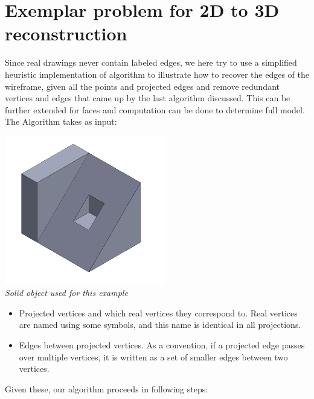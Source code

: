 \documentclass[
11pt, %
english, %
singlespacing, %
headsepline, %
]{MastersDoctoralThesis} %
\begin{document}
\section{Exemplar problem for 2D to 3D reconstruction}
Since real drawings never contain labeled edges, we here try to use a simplified heuristic implementation of algorithm to illustrate how to recover the edges of the wireframe, given all the points and projected edges and remove redundant vertices and edges that came up by the last algorithm discussed. This can be further extended for faces and computation can be done to determine full model. The Algorithm takes as input:\\
\begin{center}
\includegraphics[width = 200pt]{solid2} \\
\emph{Solid object used for this example}
\end{center}
\begin{itemize}
\item Projected vertices and which real vertices they correspond to. Real vertices are named using some symbols, and this name is identical in all projections.
\item Edges between projected vertices. As a convention, if a projected edge passes over multiple vertices, it is written as a set of smaller edges between two vertices.
\end{itemize}
Given these, our algorithm proceeds in following steps:
\end{document}
